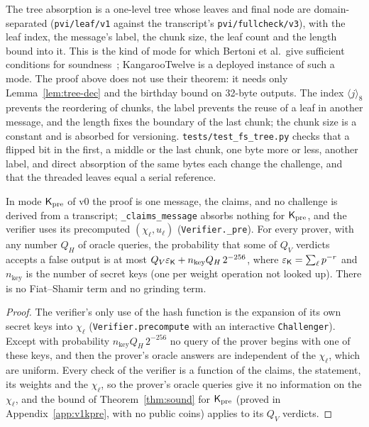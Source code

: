 \begin{remark}
\label{rem:tree}
The tree absorption is a one-level tree whose leaves and final node are domain-separated
(\texttt{pvi/leaf/v1} against the transcript's \texttt{pvi/fullcheck/v3}), with the leaf index, the
message's label, the chunk size, the leaf count and the length bound into it. This is the kind of
mode for which Bertoni et al.\ give sufficient conditions for soundness~\cite{bertoni2014tree};
KangarooTwelve is a deployed instance of such a mode. The proof above does not use their theorem:
it needs only Lemma~\ref{lem:tree-dec} and the birthday bound on 32-byte outputs. The index
$\langle j\rangle_8$ prevents the reordering of chunks, the label prevents the reuse of a leaf in
another message, and the length fixes the boundary of the last chunk; the chunk size is a constant
and is absorbed for versioning. \texttt{tests/test\_fs\_tree.py} checks that a flipped bit in the
first, a middle or the last chunk, one byte more or less, another label, and direct absorption of
the same bytes each change the challenge, and that the threaded leaves equal a serial reference.
\end{remark}

\begin{proposition}
\label{prop:kpre-fs}
In mode $\mathsf{K}_{\mathrm{pre}}$ of v0 the proof is one message, the claims, and no challenge is derived from a
transcript; \texttt{\_claims\_message} absorbs nothing for $\mathsf{K}_{\mathrm{pre}}$, and the verifier uses its
precomputed $(\chi_\ell,u_\ell)$ (\texttt{Verifier.\_pre}). For every prover, with any number $Q_H$
of oracle queries, the probability that some of $Q_V$ verdicts accepts a false output is at most
$Q_V\varepsilon_{\mathsf{K}}+n_{\mathrm{key}}Q_H\,2^{-256}$, where $\varepsilon_{\mathsf{K}}=\sum_\ell p^{-r}$ and
$n_{\mathrm{key}}$ is the number of secret keys (one per weight operation not looked up). There is
no Fiat--Shamir term and no grinding term.
\end{proposition}

\begin{proof}
The verifier's only use of the hash function is the expansion of its own secret keys into
$\chi_\ell$ (\texttt{Verifier.precompute} with an interactive \texttt{Challenger}). Except with
probability $n_{\mathrm{key}}Q_H\,2^{-256}$ no query of the prover begins with one of these keys, and
then the prover's oracle answers are independent of the $\chi_\ell$, which are uniform. Every check
of the verifier is a function of the claims, the statement, its weights and the $\chi_\ell$, so
the prover's oracle queries give it no information on the $\chi_\ell$, and the bound of
Theorem~\ref{thm:sound} for $\mathsf{K}_{\mathrm{pre}}$ (proved in Appendix~\ref{app:v1kpre}, with no public coins)
applies to its $Q_V$ verdicts.
\end{proof}


